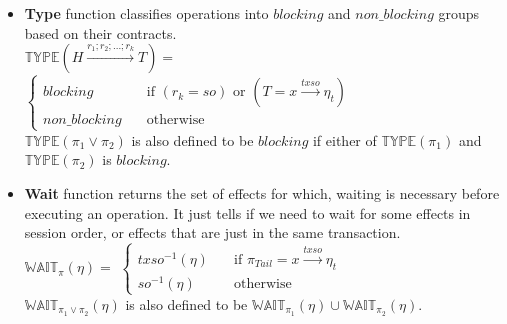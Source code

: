 \begin{itemize}
\item {\bf Type} function classifies operations into $blocking$ and $non\_blocking$ groups based on their contracts.  \\
$\mathds{TYPE} (H\xrightarrow{r_1;r_2;...;r_k}T) = $ 
$ \begin{cases}
 blocking &\quad \text{if } (r_k = so) \text{ or } (T= x \xrightarrow{txso}\eta_t)\\ 
 non\_blocking &\quad \text{otherwise} 
\end{cases}$\\
$\mathds{TYPE} (\pi_1 \vee \pi_2) $ is also defined to be $blocking$ if either of $\mathds{TYPE} (\pi_1) $ and $\mathds{TYPE} (\pi_2) $ is $blocking$.

\item {\bf Wait} function returns the set of effects for which, waiting is necessary before executing an operation. It just tells if we need to wait for some effects in session order, or effects that are just in the same transaction. \\
$\mathds{WAIT}_{\pi}(\eta) = $
$ \begin{cases}
 txso^{-1} (\eta) &\quad \text{if } \pi_{Tail} = x \xrightarrow{txso}\eta_t\\ 
so^{-1}(\eta) &\quad \text{otherwise} 
\end{cases}$\\
$\mathds{WAIT}_{\pi_1 \vee \pi_2}(\eta) $ is also defined to be $\mathds{WAIT}_{\pi_1}(\eta) \cup \mathds{WAIT}_{\pi_2} (\eta) $.




\end{itemize}
